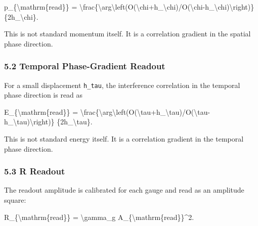 \documentclass[
  a4paper,
]{article}
\newenvironment{Shaded}{}{}
\newcommand{\NormalTok}[1]{#1}
\begin{document}
\begin{Shaded}
\begin{Highlighting}[]
\NormalTok{p\_\{\textbackslash{}mathrm\{read\}\}}
\NormalTok{=}
\NormalTok{\textbackslash{}frac\{\textbackslash{}arg\textbackslash{}left(O(\textbackslash{}chi+h\_\textbackslash{}chi)/O(\textbackslash{}chi{-}h\_\textbackslash{}chi)\textbackslash{}right)\}}
\NormalTok{\{2h\_\textbackslash{}chi\}.}
\end{Highlighting}
\end{Shaded}

This is not standard momentum itself. It is a correlation gradient in
the spatial phase direction.

\subsubsection{5.2 Temporal Phase-Gradient
Readout}\label{temporal-phase-gradient-readout}

For a small displacement \texttt{h\_tau}, the interference correlation
in the temporal phase direction is read as

\begin{Shaded}
\begin{Highlighting}[]
\NormalTok{E\_\{\textbackslash{}mathrm\{read\}\}}
\NormalTok{=}
\NormalTok{\textbackslash{}frac\{\textbackslash{}arg\textbackslash{}left(O(\textbackslash{}tau+h\_\textbackslash{}tau)/O(\textbackslash{}tau{-}h\_\textbackslash{}tau)\textbackslash{}right)\}}
\NormalTok{\{2h\_\textbackslash{}tau\}.}
\end{Highlighting}
\end{Shaded}

This is not standard energy itself. It is a correlation gradient in the
temporal phase direction.

\subsubsection{5.3 R Readout}\label{r-readout}

The readout amplitude is calibrated for each gauge and read as an
amplitude square:

\begin{Shaded}
\begin{Highlighting}[]
\NormalTok{R\_\{\textbackslash{}mathrm\{read\}\}}
\NormalTok{=}
\NormalTok{\textbackslash{}gamma\_g A\_\{\textbackslash{}mathrm\{read\}\}\^{}2.}
\end{Highlighting}
\end{Shaded}
\end{document}
